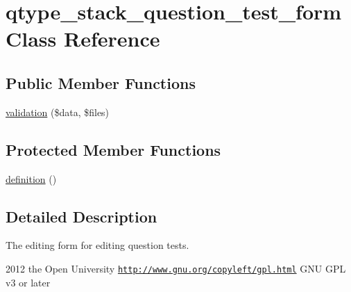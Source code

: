 \hypertarget{classqtype__stack__question__test__form}{
\section{qtype\_\-stack\_\-question\_\-test\_\-form Class Reference}
\label{classqtype__stack__question__test__form}
}
\subsection*{Public Member Functions}
\begin{DoxyCompactItemize}
\item 
\hyperlink{classqtype__stack__question__test__form_a100d85a12058c8e609292e5abecbc4e9}{validation} (\$data, \$files)
\end{DoxyCompactItemize}
\subsection*{Protected Member Functions}
\begin{DoxyCompactItemize}
\item 
\hyperlink{classqtype__stack__question__test__form_aea982b9686ff7a36d83172761ecf437f}{definition} ()
\end{DoxyCompactItemize}


\subsection{Detailed Description}
The editing form for editing question tests.

2012 the Open University  \href{http://www.gnu.org/copyleft/gpl.html}{\tt http://www.gnu.org/copyleft/gpl.html} GNU GPL v3 or later 

